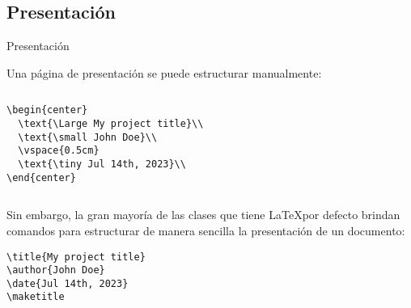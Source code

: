 \subsection{Presentación}
\begin{frame}[fragile]{Presentación}

Una página de presentación se puede estructurar manualmente:

\begin{center}
\begin{columns}

\begin{column}{0.5\textwidth}
\begin{lstlisting}[basicstyle=\tiny]
\begin{center}
  \text{\Large My project title}\\
  \text{\small John Doe}\\
  \vspace{0.5cm}
  \text{\tiny Jul 14th, 2023}\\
\end{center}
\end{lstlisting}
\end{column}

\begin{column}{0.5\textwidth}
\begin{center}
  \\
  \\
  \vspace{0.5cm}
  \\
\end{center}
\end{column}

\end{columns}
\end{center}

\pause

Sin embargo, la gran mayoría de las clases que tiene \LaTeX por defecto
brindan comandos para estructurar de manera sencilla la presentación de un
documento:

\begin{lstlisting}[basicstyle=\tiny]
\title{My project title}
\author{John Doe}
\date{Jul 14th, 2023}
\maketitle
\end{lstlisting}

\end{frame}

